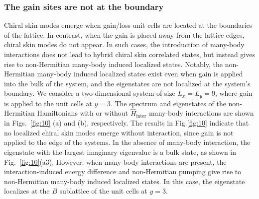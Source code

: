 \documentclass[longbibliography, aps, prx, amsmath, amssymb, amsfonts, twocolumn,superscriptaddress, footinbib]{revtex4-1}
\begin{document}
	\subsubsection{The gain sites are not at the boundary}


	Chiral skin modes emerge when gain/loss unit cells are located at the boundaries of the lattice. 
	In contrast, when the gain is placed away from the lattice edges, chiral skin modes do not appear. In such cases, the introduction of many-body interactions does not lead to hybrid chiral skin correlated states, but instead gives rise to non-Hermitian many-body induced localized states. 
	Notably, the non-Hermitian many-body induced localized states exist even when gain is applied into the bulk of the system, and the eigenstates are not localized at the system's boundary.
	We consider a two-dimensional system of size $L_x = L_y = 9$, where gain is applied to the unit cells at $y = 3$. 
	The spectrum and eigenstates of the non-Hermitian Hamiltonians with or without $\hat{H}_{\text{inter}}$ many-body interactions are shown in Figs.~\ref{fig:10} (a) and (b), respectively. 
	The results in Fig.\ref{fig:10} indicate that no localized chiral skin modes emerge without interaction, since gain is not applied to the edge of the systems. 
	In the absence of many-body interaction, the eigenstate with the largest imaginary eigenvalue is a bulk state, as shown in Fig.~\ref{fig:10}(a3). However, when many-body interactions are present, the interaction-induced energy difference and non-Hermitian pumping give rise to non-Hermitian many-body induced localized states. In this case, the eigenstate localizes at the $B$ sublattice of the unit cells at $y = 3$.
\end{document}

